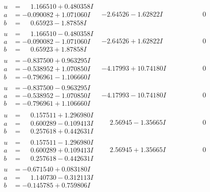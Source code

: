 \documentclass[1p]{elsarticle_modified}
\theoremstyle{definition}
\begin{document}
$$\begin{array}{c|c|c}
\begin{aligned}
u &= \phantom{-}1.166510 + 0.480358 I \\
a &= -0.090082 + 1.071060 I \\
b &= \phantom{-}0.65923 - 1.87858 I\end{aligned}
 & -2.64526 - 1.62822 I & \phantom{-0.000000 } 0 \\ \hline\begin{aligned}
u &= \phantom{-}1.166510 - 0.480358 I \\
a &= -0.090082 - 1.071060 I \\
b &= \phantom{-}0.65923 + 1.87858 I\end{aligned}
 & -2.64526 + 1.62822 I & \phantom{-0.000000 } 0 \\ \hline\begin{aligned}
u &= -0.837500 + 0.963295 I \\
a &= -0.538952 + 1.070850 I \\
b &= -0.796961 - 1.106660 I\end{aligned}
 & -4.17993 + 10.74180 I & \phantom{-0.000000 } 0 \\ \hline\begin{aligned}
u &= -0.837500 - 0.963295 I \\
a &= -0.538952 - 1.070850 I \\
b &= -0.796961 + 1.106660 I\end{aligned}
 & -4.17993 - 10.74180 I & \phantom{-0.000000 } 0 \\ \hline\begin{aligned}
u &= \phantom{-}0.157511 + 1.296980 I \\
a &= \phantom{-}0.600289 - 0.109413 I \\
b &= \phantom{-}0.257618 + 0.442631 I\end{aligned}
 & \phantom{-}2.56945 - 1.35665 I & \phantom{-0.000000 } 0 \\ \hline\begin{aligned}
u &= \phantom{-}0.157511 - 1.296980 I \\
a &= \phantom{-}0.600289 + 0.109413 I \\
b &= \phantom{-}0.257618 - 0.442631 I\end{aligned}
 & \phantom{-}2.56945 + 1.35665 I & \phantom{-0.000000 } 0 \\ \hline\begin{aligned}
u &= -0.671540 + 0.083180 I \\
a &= \phantom{-}1.140730 - 0.312113 I \\
b &= -0.145785 + 0.759806 I\end{aligned}

\end{array}$$
\end{document}
